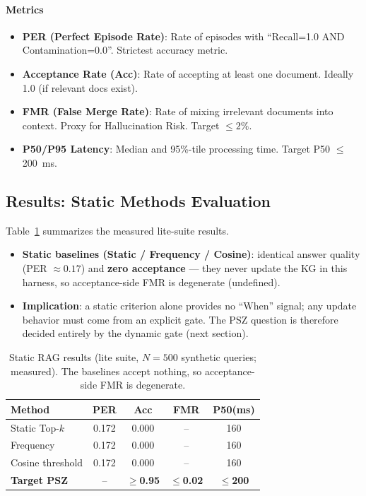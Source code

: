 \documentclass[12pt]{article}
\begin{document}
\paragraph{Metrics}\;
\begin{itemize}
    \item \textbf{PER (Perfect Episode Rate)}: Rate of episodes with ``Recall=1.0 AND Contamination=0.0''. Strictest accuracy metric.
    \item \textbf{Acceptance Rate (Acc)}: Rate of accepting at least one document. Ideally 1.0 (if relevant docs exist).
    \item \textbf{FMR (False Merge Rate)}: Rate of mixing irrelevant documents into context. Proxy for Hallucination Risk. Target $\le 2\%$.
    \item \textbf{P50/P95 Latency}: Median and 95\%-tile processing time. Target P50 $\le$ \SI{200}{ms}.
\end{itemize}

\subsection{Results: Static Methods Evaluation}
Table~\ref{tab:rag_static_result} summarizes the measured lite-suite results.
\begin{itemize}
    \item \textbf{Static baselines (Static / Frequency / Cosine)}: identical answer quality (PER $\approx 0.17$) and \textbf{zero acceptance} --- they never update the KG in this harness, so acceptance-side FMR is degenerate (undefined).
    \item \textbf{Implication}: a static criterion alone provides no ``When'' signal; any update behavior must come from an explicit gate. The PSZ question is therefore decided entirely by the dynamic gate (next section).
\end{itemize}

\begin{table}[H]
    \centering
    \caption{Static RAG results (lite suite, $N=500$ synthetic queries; measured). The baselines accept nothing, so acceptance-side FMR is degenerate.}
    \label{tab:rag_static_result}
    \small
    \begin{tabular}{lcccc}
    \toprule
    Method & PER & Acc & FMR & P50(ms) \\
    \midrule
    Static Top-$k$ & 0.172 & 0.000 & -- & 160 \\
    Frequency & 0.172 & 0.000 & -- & 160 \\
    Cosine threshold & 0.172 & 0.000 & -- & 160 \\
    \textbf{Target PSZ} & -- & \textbf{$\ge$0.95} & \textbf{$\le$0.02} & \textbf{$\le$200} \\
    \bottomrule
    \end{tabular}
\end{table}
\end{document}
